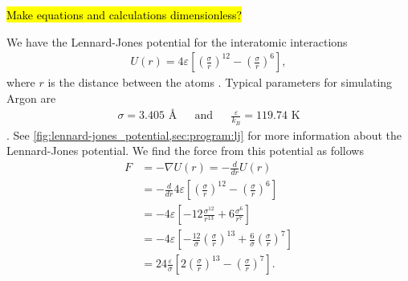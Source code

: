 \hl{Make equations and calculations dimensionless?}

We have the Lennard-Jones potential for the interatomic interactions
\begin{align}%
    U(r) = 4\varepsilon \left[ \left(\frac{\sigma}{r}\right)^{12} - \left(\frac{\sigma}{r}\right)^6 \right], \label{eq:LJ}%
\end{align}%
where $r$ is the distance between the atoms%
. Typical parameters for simulating Argon are
\begin{align*}%
    &\sigma = 3.405 \text{ \AA}& &\text{and}& &\frac{\varepsilon}{k_B} = 119.74 \text{ K}&%
\end{align*}%
. See \cref{fig:lennard-jones_potential,sec:program:lj} for more information about the Lennard-Jones potential. We find the force from this potential as follows
\begin{align*}%
    F &= -\nabla U(r) = - \frac{d}{dr}U(r) \\%
    &= -\frac{d}{dr} 4\varepsilon \left[\left(\frac{\sigma}{r}\right)^{12} - \left(\frac{\sigma}{r}\right)^6 \right] \\%
    &= -4\varepsilon \left[-12 \frac{\sigma^{12}}{r^{13}} + 6 \frac{\sigma^6}{r^7} \right] \\%
    &= -4 \varepsilon \left[ -\frac{12}{\sigma}\left(\frac{\sigma}{r}\right)^{13} + \frac{6}{\sigma}\left(\frac{\sigma}{r}\right)^7 \right] \\%
    &= 24 \frac{\varepsilon}{\sigma} \left[ 2\left(\frac{\sigma}{r}\right)^{13} - \left(\frac{\sigma}{r}\right)^7 \right].%
\end{align*}%

